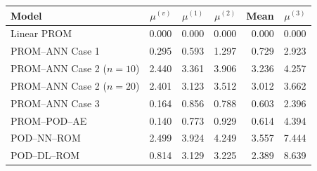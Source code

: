 \begin{tabular}{lrrrrr}
\toprule
Model & $\mu^{(v)}$ & $\mu^{(1)}$ & $\mu^{(2)}$ & Mean & $\mu^{(3)}$ \\
\midrule
Linear PROM & 0.000 & 0.000 & 0.000 & 0.000 & 0.000 \\
PROM--ANN Case 1 & 0.295 & 0.593 & 1.297 & 0.729 & 2.923 \\
PROM--ANN Case 2 ($n=10$) & 2.440 & 3.361 & 3.906 & 3.236 & 4.257 \\
PROM--ANN Case 2 ($n=20$) & 2.401 & 3.123 & 3.512 & 3.012 & 3.662 \\
PROM--ANN Case 3 & 0.164 & 0.856 & 0.788 & 0.603 & 2.396 \\
PROM--POD--AE & 0.140 & 0.773 & 0.929 & 0.614 & 4.394 \\
\midrule
POD--NN--ROM & 2.499 & 3.924 & 4.249 & 3.557 & 7.444 \\
POD--DL--ROM & 0.814 & 3.129 & 3.225 & 2.389 & 8.639 \\
\bottomrule
\end{tabular}
